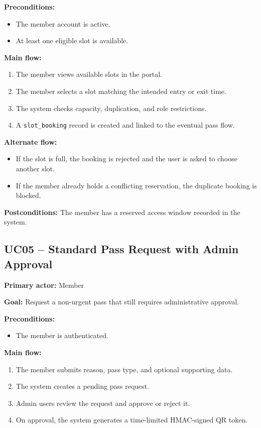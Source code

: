 \documentclass[12pt,letterpaper]{article}
\begin{document}
\textbf{Preconditions:}
\begin{itemize}
    \item The member account is active.
    \item At least one eligible slot is available.
\end{itemize}

\textbf{Main flow:}
\begin{enumerate}
    \item The member views available slots in the portal.
    \item The member selects a slot matching the intended entry or exit time.
    \item The system checks capacity, duplication, and role restrictions.
    \item A \texttt{slot\_booking} record is created and linked to the eventual pass flow.
\end{enumerate}

\textbf{Alternate flow:}
\begin{itemize}
    \item If the slot is full, the booking is rejected and the user is asked to choose another slot.
    \item If the member already holds a conflicting reservation, the duplicate booking is blocked.
\end{itemize}

\textbf{Postconditions:} The member has a reserved access window recorded in the system.

\subsection{UC05 -- Standard Pass Request with Admin Approval}
\textbf{Primary actor:} Member

\textbf{Goal:} Request a non-urgent pass that still requires administrative approval.

\textbf{Preconditions:}
\begin{itemize}
    \item The member is authenticated.
\end{itemize}

\textbf{Main flow:}
\begin{enumerate}
    \item The member submits reason, pass type, and optional supporting data.
    \item The system creates a pending pass request.
    \item Admin users review the request and approve or reject it.
    \item On approval, the system generates a time-limited HMAC-signed QR token.
\end{enumerate}
\end{document}
